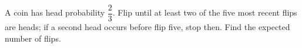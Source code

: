 A coin has head probability $\dfrac{2}{3}$. Flip until at least two of the five most recent flips are heads; if a second head occurs before flip five, stop then. Find the expected number of flips.
